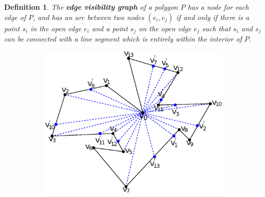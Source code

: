 \documentclass[sageh,times,Review]{sagej}
\newtheorem{definition}{Definition}
\begin{document}
\begin{definition}
The \textbf{edge visibility graph} of a polygon $P$ has a node for each edge of
$P$, and has an arc between two nodes $(e_i, e_j)$ if and only if there is a
point $s_i$ in the open edge $e_i$ and a point $s_j$ on the open edge $e_j$ such
that $s_i$ and $s_j$ can be connected with a line segment which is entirely
within the interior of $P$.
\end{definition}


\begin{figure}[h]
\centering
\begin{subfigure}{0.5\columnwidth}
    \centering
    \includegraphics[width=\linewidth]{tikz1.eps}
\end{subfigure}%
\begin{subfigure}{0.5\columnwidth}
    \centering

\end{subfigure}
\end{figure}
\end{document}
